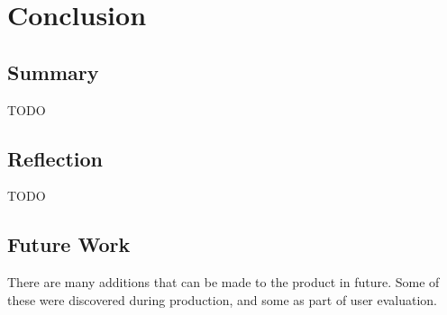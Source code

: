 \chapter{Conclusion}


\section{Summary}
TODO

\section{Reflection}
TODO

\section{Future Work}

There are many additions that can be made to the product in future. Some of these were discovered during production, and some as part of user evaluation.

